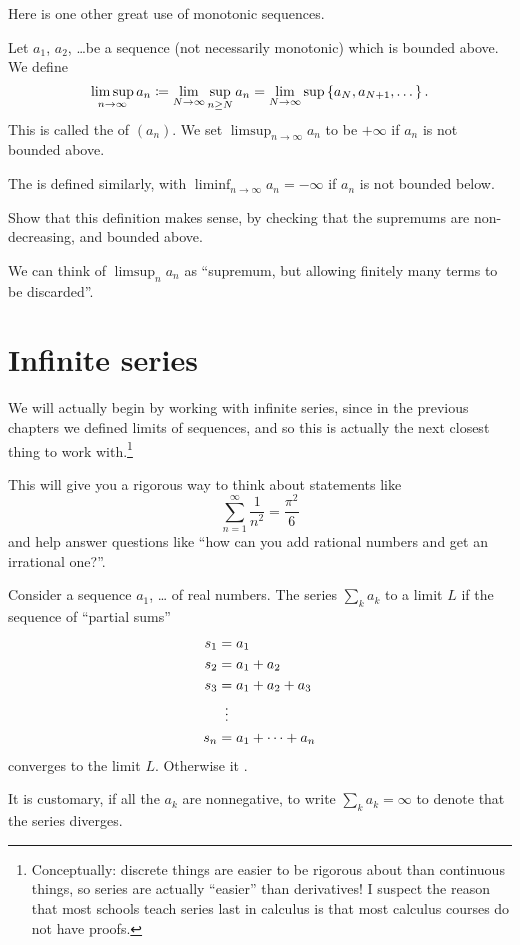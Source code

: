 Here is one other great use of monotonic sequences.
\begin{definition}
	Let $a_1$, $a_2$, \dots be a sequence
	(not necessarily monotonic) which is bounded above.
	We define
	\[
		\limsup_{n \to \infty} a_n
		\coloneqq \lim_{N \to \infty} \sup_{n \ge N} a_n
		= \lim_{N \to \infty} \sup \left\{ a_N, a_{N+1}, \dots \right\}.
	\]
	This is called the  of $(a_n)$.
	We set $\limsup_{n \to \infty} a_n$ to be $+\infty$
	if $a_n$ is not bounded above.

	The  is defined similarly,
	with $\liminf_{n \to \infty} a_n = -\infty$
	if $a_n$ is not bounded below.
\end{definition}
\begin{exercise}
	Show that this definition makes sense,
	by checking that the supremums are non-decreasing,
	and bounded above.
\end{exercise}
We can think of $\limsup_n a_n$ as
``supremum, but allowing finitely many terms to be discarded''.


\section{Infinite series}

We will actually begin by working with infinite series,
since in the previous chapters we defined limits of sequences,
and so this is actually the next closest thing to work
with.\footnote{Conceptually: discrete things are easier
	to be rigorous about than continuous things,
	so series are actually ``easier'' than derivatives!
	I suspect the reason that most schools teach series last in calculus
	is that most calculus courses do not have proofs.}

This will give you a rigorous way to think about
statements like
\[ \sum_{n = 1}^{\infty} \frac{1}{n^2} = \frac{\pi^2}{6} \]
and help answer questions like
``how can you add rational numbers and get an irrational one?''.

\begin{definition}
	Consider a sequence $a_1$, \dots{} of real numbers.
	The series $\sum_k a_k$  to a limit $L$ if
	the sequence of ``partial sums''
	\begin{align*}
		s_1 &= a_1 \\
		s_2 &= a_1 + a_2 \\
		s_3 &= a_1 + a_2 + a_3 \\
		&\vdotswithin= \\
		s_n &= a_1 + \dots + a_n
	\end{align*}
	converges to the limit $L$.
	Otherwise it .
\end{definition}
\begin{abuse}
	It is customary, if all the $a_k$ are nonnegative,
	to write $\sum_k a_k = \infty$ to denote that the series diverges.
\end{abuse}

